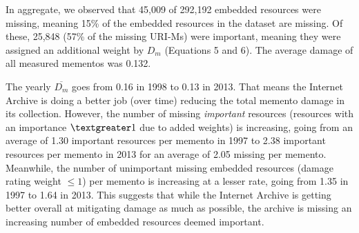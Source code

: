 





In aggregate, we observed that 45,009 of 292,192 embedded resources were missing, meaning 15\% of the embedded resources in the dataset are missing. Of these, 25,848  (57\% of the missing URI-Ms) were important, meaning they were assigned an additional weight by $D_m$ (Equations 5 and 6). The average damage of all measured mementos was 0.132.

The yearly $\overline{D_m}$ goes from 0.16 in 1998 to 0.13 in 2013. That means the Internet Archive is doing a better job (over time) reducing the total memento damage in its collection. However, the number of missing \emph{important} resources (resources with an importance $\textgreater 1$ due to added weights) is increasing, going from an average of 1.30 important resources per memento in 1997 to 2.38 important resources per memento in 2013 for an average of 2.05 missing per memento. Meanwhile, the number of unimportant missing embedded resources (damage rating weight $\leq 1$) per memento is increasing at a lesser rate, going from 1.35 in 1997 to 1.64 in 2013. This suggests that while the Internet Archive is getting better overall at mitigating damage as much as possible, the archive is missing an increasing number of embedded resources deemed important. 

